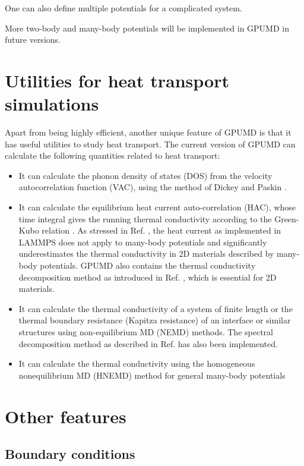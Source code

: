 \documentclass[12pt,a4paper]{report}
\begin{document}
One can also define multiple potentials for a complicated system. 

More two-body and many-body potentials will be implemented in GPUMD in future versions.

\section{Utilities for heat transport simulations}

Apart from being highly efficient, another unique feature of GPUMD is that it has useful utilities to study heat transport. The current version of GPUMD can calculate the following quantities related to heat transport:
\begin{itemize}
\item It can calculate the phonon density of states (DOS) from the velocity autocorrelation function (VAC), using the method of Dickey and Paskin \cite{dickey1969pr}.
\item It can calculate the equilibrium heat current auto-correlation (HAC), whose time integral gives the running thermal conductivity according to the Green-Kubo relation \cite{green1954jcp,kubo1957jpsj}. As stressed in Ref. \cite{fan2015prb}, the heat current as implemented in LAMMPS \cite{plimpton1995jcp} does not apply to many-body potentials and significantly underestimates the thermal conductivity in 2D materials described by many-body potentials. GPUMD also contains the thermal conductivity decomposition method as introduced in Ref. \cite{fan2017prb}, which is essential for 2D materials.
\item It can calculate the thermal conductivity of a system of finite length or the thermal boundary resistance (Kapitza resistance) of an interface or similar structures using non-equilibrium MD (NEMD) methods. The spectral decomposition method as described in Ref. \cite{fan2017prb} has also been implemented.
\item It can calculate the thermal conductivity using the homogeneous nonequilibrium MD (HNEMD) method \cite{evans1982pla} for general many-body potentials \cite{fan2018submitted}
\end{itemize}



\section{Other features}

\subsection{Boundary conditions}
\end{document}
